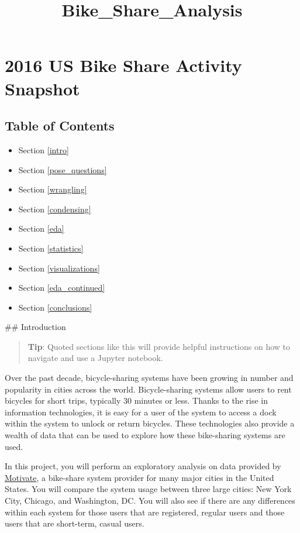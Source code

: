 \documentclass[11pt]{article}
\title{Bike\_Share\_Analysis}
\providecommand{\tightlist}{%
      \setlength{\itemsep}{0pt}\setlength{\parskip}{0pt}}
\begin{document}
    
    
    \maketitle
    
    

    
    \section{2016 US Bike Share Activity
Snapshot}\label{us-bike-share-activity-snapshot}

\subsection{Table of Contents}\label{table-of-contents}

\begin{itemize}
\tightlist
\item
  Section \ref{intro}
\item
  Section \ref{pose_questions}
\item
  Section \ref{wrangling}
\item
  Section \ref{condensing}
\item
  Section \ref{eda}
\item
  Section \ref{statistics}
\item
  Section \ref{visualizations}
\item
  Section \ref{eda_continued}
\item
  Section \ref{conclusions}
\end{itemize}

 \#\# Introduction

\begin{quote}
\textbf{Tip}: Quoted sections like this will provide helpful
instructions on how to navigate and use a Jupyter notebook.
\end{quote}

Over the past decade, bicycle-sharing systems have been growing in
number and popularity in cities across the world. Bicycle-sharing
systems allow users to rent bicycles for short trips, typically 30
minutes or less. Thanks to the rise in information technologies, it is
easy for a user of the system to access a dock within the system to
unlock or return bicycles. These technologies also provide a wealth of
data that can be used to explore how these bike-sharing systems are
used.

In this project, you will perform an exploratory analysis on data
provided by \href{https://www.motivateco.com/}{Motivate}, a bike-share
system provider for many major cities in the United States. You will
compare the system usage between three large cities: New York City,
Chicago, and Washington, DC. You will also see if there are any
differences within each system for those users that are registered,
regular users and those users that are short-term, casual users.
\end{document}
